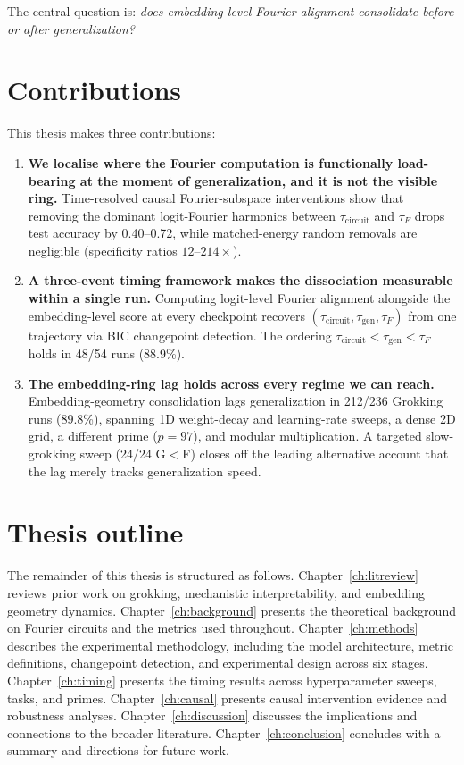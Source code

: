 \documentclass[12pt,openany,a4paper]{book}
\newcommand{\taug}{\tau_{\mathrm{gen}}}
\newcommand{\tauf}{\tau_{F}}
\newcommand{\taucirc}{\tau_{\mathrm{circuit}}}
\begin{document}
The central question is: \emph{does embedding-level Fourier alignment consolidate before or after generalization?}

\section{Contributions}

This thesis makes three contributions:
\begin{enumerate}
  \item \textbf{We localise where the Fourier computation is functionally load-bearing at the moment of generalization, and it is not the visible ring.} Time-resolved causal Fourier-subspace interventions show that removing the dominant logit-Fourier harmonics between $\taucirc$ and $\tauf$ drops test accuracy by 0.40--0.72, while matched-energy random removals are negligible (specificity ratios $12$--$214\times$).

  \item \textbf{A three-event timing framework makes the dissociation measurable within a single run.} Computing logit-level Fourier alignment alongside the embedding-level score at every checkpoint recovers $(\taucirc, \taug, \tauf)$ from one trajectory via BIC changepoint detection. The ordering $\taucirc < \taug < \tauf$ holds in 48/54 runs (88.9\%).

  \item \textbf{The embedding-ring lag holds across every regime we can reach.} Embedding-geometry consolidation lags generalization in 212/236 Grokking runs (89.8\%), spanning 1D weight-decay and learning-rate sweeps, a dense 2D grid, a different prime ($p{=}97$), and modular multiplication. A targeted slow-grokking sweep (24/24 G$<$F) closes off the leading alternative account that the lag merely tracks generalization speed.
\end{enumerate}

\section{Thesis outline}

The remainder of this thesis is structured as follows. Chapter~\ref{ch:litreview} reviews prior work on grokking, mechanistic interpretability, and embedding geometry dynamics. Chapter~\ref{ch:background} presents the theoretical background on Fourier circuits and the metrics used throughout. Chapter~\ref{ch:methods} describes the experimental methodology, including the model architecture, metric definitions, changepoint detection, and experimental design across six stages. Chapter~\ref{ch:timing} presents the timing results across hyperparameter sweeps, tasks, and primes. Chapter~\ref{ch:causal} presents causal intervention evidence and robustness analyses. Chapter~\ref{ch:discussion} discusses the implications and connections to the broader literature. Chapter~\ref{ch:conclusion} concludes with a summary and directions for future work.
\end{document}
